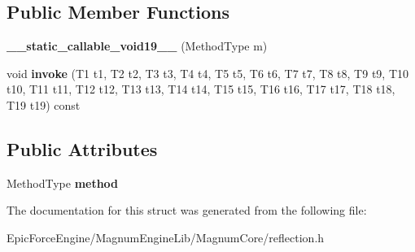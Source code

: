 \subsection*{Public Member Functions}
\begin{DoxyCompactItemize}
\item 
{\bfseries \+\_\+\+\_\+static\+\_\+callable\+\_\+void19\+\_\+\+\_\+} (Method\+Type m)\hypertarget{structagm_1_1reflection_1_1____static__callable__void19_____a11a878c1897a62eebc1acebd6bd7f7b0}{}\label{structagm_1_1reflection_1_1____static__callable__void19_____a11a878c1897a62eebc1acebd6bd7f7b0}

\item 
void {\bfseries invoke} (T1 t1, T2 t2, T3 t3, T4 t4, T5 t5, T6 t6, T7 t7, T8 t8, T9 t9, T10 t10, T11 t11, T12 t12, T13 t13, T14 t14, T15 t15, T16 t16, T17 t17, T18 t18, T19 t19) const \hypertarget{structagm_1_1reflection_1_1____static__callable__void19_____a963df96c16e2814988fc060267893a96}{}\label{structagm_1_1reflection_1_1____static__callable__void19_____a963df96c16e2814988fc060267893a96}

\end{DoxyCompactItemize}
\subsection*{Public Attributes}
\begin{DoxyCompactItemize}
\item 
Method\+Type {\bfseries method}\hypertarget{structagm_1_1reflection_1_1____static__callable__void19_____a6f025065af0e468b1ab44e599eca0737}{}\label{structagm_1_1reflection_1_1____static__callable__void19_____a6f025065af0e468b1ab44e599eca0737}

\end{DoxyCompactItemize}


The documentation for this struct was generated from the following file\+:\begin{DoxyCompactItemize}
\item 
Epic\+Force\+Engine/\+Magnum\+Engine\+Lib/\+Magnum\+Core/reflection.\+h\end{DoxyCompactItemize}
